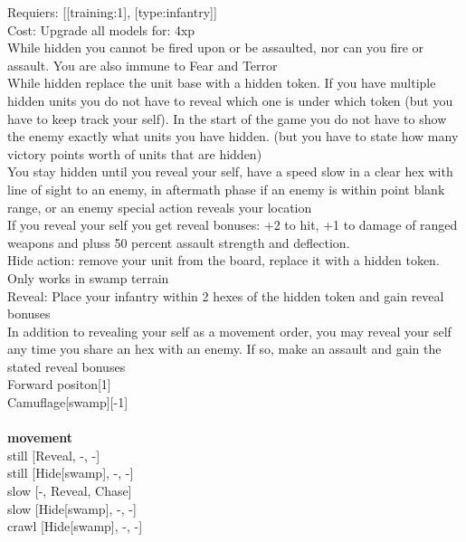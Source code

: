 Requiers: [[training:1], [type:infantry]] \\
Cost: Upgrade all models for: 4xp \\
While hidden you cannot be fired upon or be assaulted, nor can you fire or assault. You are also immune to Fear and Terror\\ 
While hidden replace the unit base with a hidden token. If you have multiple hidden units you do not have to reveal which one is under which token (but you have to keep track your self). In the start of the game you do not have to show the enemy exactly what units you have hidden. (but you have to state how many victory points worth of units that are hidden)\\ 
You stay hidden until you reveal your self, have a speed slow in a clear hex with line of sight to an enemy, in aftermath phase if an enemy is within point blank range, or an enemy special action reveals your location\\ 
If you reveal your self you get reveal bonuses: +2 to hit, +1 to damage of ranged weapons and pluss 50 percent assault strength and deflection.\\ 
Hide action: remove your unit from the board, replace it with a hidden token. Only works in swamp terrain\\ 
Reveal: Place your infantry within 2 hexes of the hidden token and gain reveal bonuses\\ 
In addition to revealing your self as a movement order, you may reveal your self any time you share an hex with an enemy. If so, make an assault and gain the stated reveal bonuses\\ 
Forward positon[1]\\ 
Camuflage[swamp][-1]\\ 








\ \\ {\bf movement } \\
still [Reveal, -, -] \\
still [Hide[swamp], -, -] \\
slow [-, Reveal, Chase] \\
slow [Hide[swamp], -, -] \\
crawl [Hide[swamp], -, -] \\

